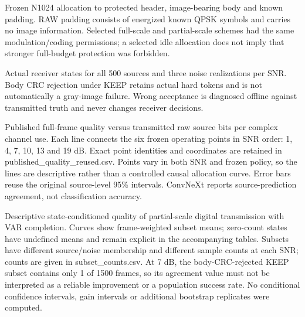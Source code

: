 \caption{Frozen N1024 allocation to protected header, image-bearing body and known padding. RAW padding consists of energized known QPSK symbols and carries no image information. Selected full-scale and partial-scale schemes had the same modulation/coding permissions; a selected idle allocation does not imply that stronger full-budget protection was forbidden.}
\caption{Actual receiver states for all 500 sources and three noise realizations per SNR. Body CRC rejection under KEEP retains actual hard tokens and is not automatically a gray-image failure. Wrong acceptance is diagnosed offline against transmitted truth and never changes receiver decisions.}
\caption{Published full-frame quality versus transmitted raw source bits per complex channel use. Each line connects the six frozen operating points in SNR order: 1, 4, 7, 10, 13 and 19 dB. Exact point identities and coordinates are retained in published_quality_reused.csv. Points vary in both SNR and frozen policy, so the lines are descriptive rather than a controlled causal allocation curve. Error bars reuse the original source-level 95\% intervals. ConvNeXt reports source-prediction agreement, not classification accuracy.}
\caption{Descriptive state-conditioned quality of partial-scale digital transmission with VAR completion. Curves show frame-weighted subset means; zero-count states have undefined means and remain explicit in the accompanying tables. Subsets have different source/noise membership and different sample counts at each SNR; counts are given in subset_counts.csv. At 7 dB, the body-CRC-rejected KEEP subset contains only 1 of 1500 frames, so its agreement value must not be interpreted as a reliable improvement or a population success rate. No conditional confidence intervals, gain intervals or additional bootstrap replicates were computed.}
